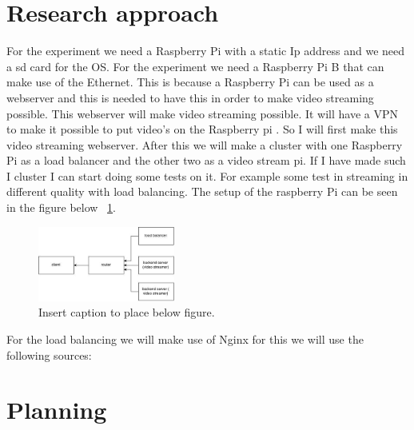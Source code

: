 \documentclass{sig-alternate-br}
\begin{document}
\section{Research approach}
For the experiment we need a Raspberry Pi with a static Ip address and we need a sd card for the OS. For the experiment we need a Raspberry Pi B that can make use of the Ethernet. This is because a Raspberry Pi can be used as a webserver and this is needed to have this in order to make video streaming possible. This webserver will make video streaming possible. It will have a VPN to make it possible to put video's on the Raspberry pi \cite{VPN:2014}. 
So I will first make this video streaming webserver. 
After this we will make a cluster with one Raspberry Pi as a load balancer and the other two as a video stream pi. If I have made such I cluster I can start doing some tests on it. For example some test in streaming in different quality with load balancing. The setup of the raspberry Pi can be seen in the figure below ~\ref{fig:setup}.

\begin{figure}[H]
\centering 
\includegraphics[width=0.4\textwidth]{raspberry pi setup.jpg}
\caption{Insert caption to place below figure.}
\label{fig:setup} %
\end{figure}
For the load balancing we will make use of Nginx for this we will use the following sources:
\cite{nginx-load-balancing, nginx-load-balancing-2}


\section{Planning}
\end{document}
